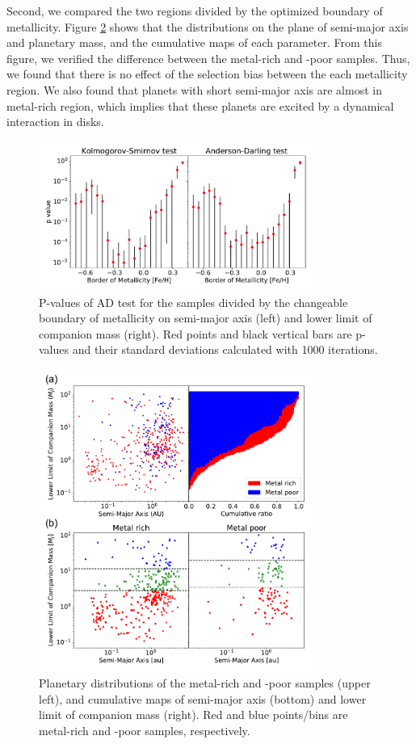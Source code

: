 \documentclass[twocolumn, dvipdfmx]{aastex62}
\begin{document}
\begin{CJK*}{UTF8}{min}
Second, we compared the two regions divided by the optimized boundary of metallicity. Figure \ref{fig:a_Mp} shows that the distributions on the plane of semi-major axis and planetary mass, and the cumulative maps of each parameter. From this figure, we verified the difference between the metal-rich and -poor samples. Thus, we found that there is no effect of the selection bias between the each metallicity region. We also found that planets with short semi-major axis are almost in metal-rich region, which implies that these planets are excited by a dynamical interaction in disks.

\begin{figure}[t]
\begin{center}
\includegraphics[width=9cm]{../../../Figure/pvalues_plot.pdf}
\caption{P-values of AD test for the samples divided by the changeable boundary of metallicity on semi-major axis (left) and lower limit of companion mass (right). Red points and black vertical bars are p-values and their standard deviations calculated with 1000 iterations. \label{fig:pvalue}}
\end{center}
\end{figure}

\begin{figure}[t]
\begin{center}
\includegraphics[width=9cm]{../../../Figure/a_Mp.pdf}
\caption{Planetary distributions of the metal-rich and -poor samples (upper left), and cumulative maps of semi-major axis (bottom) and lower limit of companion mass (right). Red and blue points/bins are metal-rich and -poor samples, respectively. \label{fig:a_Mp}}
\end{center}
\end{figure}



\end{CJK*}
\end{document}
